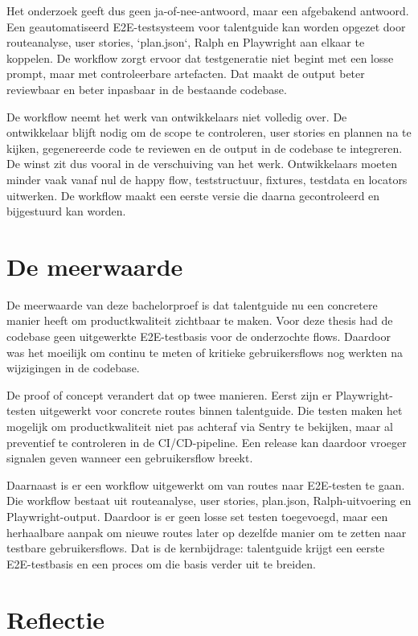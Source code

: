 Het onderzoek geeft dus geen ja-of-nee-antwoord, maar een afgebakend antwoord. Een geautomatiseerd E2E-testsysteem voor talentguide kan worden opgezet door routeanalyse, user stories, `plan.json`, Ralph en Playwright aan elkaar te koppelen. De workflow zorgt ervoor dat testgeneratie niet begint met een losse prompt, maar met controleerbare artefacten. Dat maakt de output beter reviewbaar en beter inpasbaar in de bestaande codebase.

De workflow neemt het werk van ontwikkelaars niet volledig over. De ontwikkelaar blijft nodig om de scope te controleren, user stories en plannen na te kijken, gegenereerde code te reviewen en de output in de codebase te integreren. De winst zit dus vooral in de verschuiving van het werk. Ontwikkelaars moeten minder vaak vanaf nul de happy flow, teststructuur, fixtures, testdata en locators uitwerken. De workflow maakt een eerste versie die daarna gecontroleerd en bijgestuurd kan worden.

\section{De meerwaarde}
De meerwaarde van deze bachelorproef is dat talentguide nu een concretere manier heeft om productkwaliteit zichtbaar te maken. Voor deze thesis had de codebase geen uitgewerkte E2E-testbasis voor de onderzochte flows. Daardoor was het moeilijk om continu te meten of kritieke gebruikersflows nog werkten na wijzigingen in de codebase.

De proof of concept verandert dat op twee manieren. Eerst zijn er Playwright-testen uitgewerkt voor concrete routes binnen talentguide. Die testen maken het mogelijk om productkwaliteit niet pas achteraf via Sentry te bekijken, maar al preventief te controleren in de CI/CD-pipeline. Een release kan daardoor vroeger signalen geven wanneer een gebruikersflow breekt.

Daarnaast is er een workflow uitgewerkt om van routes naar E2E-testen te gaan. Die workflow bestaat uit routeanalyse, user stories, plan.json, Ralph-uitvoering en Playwright-output. Daardoor is er geen losse set testen toegevoegd, maar een herhaalbare aanpak om nieuwe routes later op dezelfde manier om te zetten naar testbare gebruikersflows. Dat is de kernbijdrage: talentguide krijgt een eerste E2E-testbasis en een proces om die basis verder uit te breiden.

\section{Reflectie}

